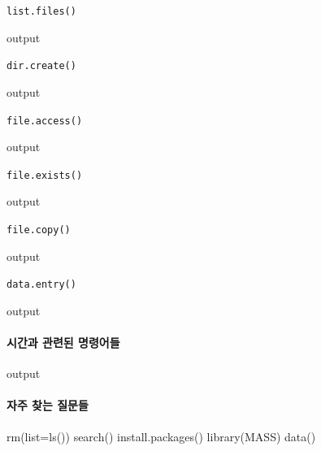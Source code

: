 \documentclass{report}
\begin{document}
\texttt{list.files()}
\begin{Schunk}
\begin{Soutput}
output
\end{Soutput}
\end{Schunk}

\texttt{dir.create()}
\begin{Schunk}
\begin{Soutput}
output
\end{Soutput}
\end{Schunk}

\texttt{file.access()}
\begin{Schunk}
\begin{Soutput}
output
\end{Soutput}
\end{Schunk}

\texttt{file.exists()}
\begin{Schunk}
\begin{Soutput}
output
\end{Soutput}
\end{Schunk}

\texttt{file.copy()}
\begin{Schunk}
\begin{Soutput}
output
\end{Soutput}
\end{Schunk}

\texttt{data.entry()}
\begin{Schunk}
\begin{Soutput}
output
\end{Soutput}
\end{Schunk}

\paragraph{시간과 관련된 명령어들}
\begin{Schunk}
\begin{Soutput}
output
\end{Soutput}
\end{Schunk}

\paragraph{자주 찾는 질문들}
\begin{Schunk}
\begin{Soutput}
rm(list=ls())
search()
install.packages()
library(MASS)
data()

\end{Soutput}
\end{Schunk}
\end{document}
